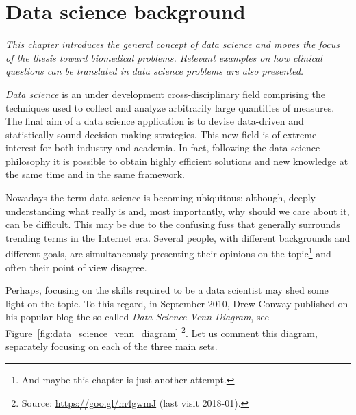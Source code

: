 
\chapter{Data science background} \label{chap:background}

\begin{displayquote}
	\textit{This chapter introduces the general concept of data science and moves the focus of the thesis toward biomedical problems. Relevant examples on how clinical questions can be translated in data science problems are also presented.}
\end{displayquote}

\textit{Data science} is an under development cross-disciplinary field comprising the techniques used to collect and analyze arbitrarily large quantities of measures. The final aim of a data science application is to devise data-driven and statistically sound decision making strategies.
This new field is of extreme interest for both industry and academia. In fact, following the data science philosophy it is possible to obtain highly efficient solutions and new knowledge at the same time and in the same framework.

Nowadays the term data science is becoming ubiquitous; although, deeply understanding what really is and, most importantly, why should we care about it, can be difficult.
This may be due to the confusing fuss that generally surrounds trending terms in the Internet era. Several people, with different backgrounds and different goals, are simultaneously presenting their opinions on the topic\footnote{ And maybe this chapter is just another attempt.} and often their point of view disagree.

Perhaps, focusing on the skills required to be a data scientist may shed some light on the topic. To this regard, in September 2010, Drew Conway published on his popular blog the so-called \textit{Data Science Venn Diagram}, see Figure~\ref{fig:data_science_venn_diagram} \footnote{ Source: \url{https://goo.gl/m4gwmJ} (last visit 2018-01).}.
Let us comment this diagram, separately focusing on each of the three main sets.

